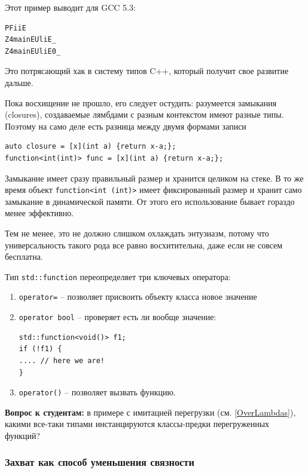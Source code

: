 \documentclass[a4paper,12pt,oneside]{article}
\begin{document}
Этот пример выводит для GCC 5.3: 

\begin{verbatim}
PFiiE
Z4mainEUliE_
Z4mainEUliE0_
\end{verbatim}

Это потрясающий хак в систему типов C++, который получит свое развитие дальше.

Пока восхищение не прошло, его следует остудить: разумеется замыкания (closures), создаваемые лямбдами с разным контекстом имеют разные типы. Поэтому на само деле есть разница между двумя формами записи

\begin{lstlisting}
auto closure = [x](int a) {return x-a;};
function<int(int)> func = [x](int a) {return x-a;};
\end{lstlisting}

Замыкание имеет сразу правильный размер и хранится целиком на стеке. В то же время объект \lstinline!function<int (int)>! имеет фиксированный размер и хранит само замыкание в динамической памяти. От этого его использование бывает гораздо менее эффективно.

Тем не менее, это не должно слишком охлаждать энтузиазм, потому что универсальность такого рода все равно восхитительна, даже если не совсем бесплатна.

Тип \lstinline!std::function! переопределяет три ключевых оператора:

\begin{enumerate}
\item\lstinline!operator=! -- позволяет присвоить объекту класса новое значение

\item\lstinline!operator bool! -- проверяет есть ли вообще значение:

\begin{lstlisting}
std::function<void()> f1;
if (!f1) {
.... // here we are!
}
\end{lstlisting}

\item\lstinline!operator()! -- позволяет вызвать функцию.
\end{enumerate}

\textbf{Вопрос к студентам:} в примере с имитацией перегрузки (см. \ref{OverLambdas}), какими все-таки типами инстанцируются классы-предки перегруженных функций?

\subsubsection{Захват как способ уменьшения связности}
\end{document}
